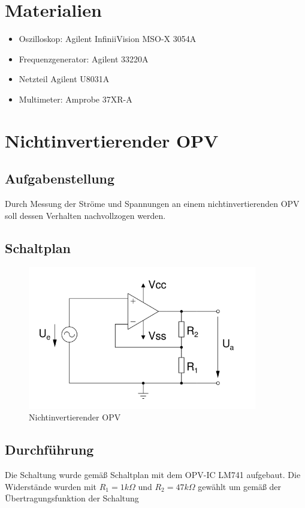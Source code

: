 \documentclass[12pt,a4paper,titlepage]{article}
\begin{document}
\setcounter{page}{2}

\newpage
\setcounter{tocdepth}{1}
\tableofcontents

\newpage

\section*{Materialien}
\begin{itemize}
	\item Oszilloskop: Agilent InfiniiVision MSO-X 3054A
	\item Frequenzgenerator: Agilent 33220A
  \item Netzteil Agilent U8031A
  \item Multimeter: Amprobe 37XR-A
\end{itemize}

\section{Nichtinvertierender OPV}

\subsection*{Aufgabenstellung}
Durch Messung der Ströme und Spannungen an einem nichtinvertierenden OPV soll dessen Verhalten nachvollzogen werden.

\subsection*{Schaltplan}
\begin{figure}[H]
  \centering
  \includegraphics[width=100mm]{ni_opv_schaltung.png}
  \caption{Nichtinvertierender OPV}
\end{figure}

\subsection*{Durchf\"uhrung}
Die Schaltung wurde gemäß Schaltplan mit dem OPV-IC LM741 aufgebaut. Die Widerstände wurden mit $R_1 = 1k\Omega$ und $R_2 = 47k\Omega$ gewählt um gemäß der Übertragungsfunktion der Schaltung
\end{document}
